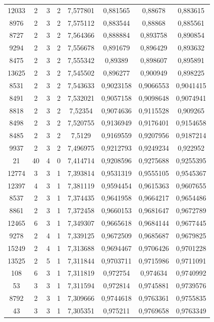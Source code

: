 \begin{longtable}{|c|c|c|c|c|c|c|c|}
12033 & 2 & 3 & 2 & 7,577801 & 0,881565 & 0,88678 & 0,883615 \\
8976 & 2 & 3 & 2 & 7,575112 & 0,883544 & 0,88868 & 0,885561 \\
8727 & 2 & 3 & 2 & 7,564366 & 0,888884 & 0,893758 & 0,890854 \\
9294 & 2 & 3 & 2 & 7,556678 & 0,891679 & 0,896429 & 0,893632 \\
8475 & 2 & 3 & 2 & 7,555342 & 0,89389 & 0,898607 & 0,895891 \\
13625 & 2 & 3 & 2 & 7,545502 & 0,896277 & 0,900949 & 0,898225 \\
8531 & 2 & 3 & 2 & 7,543633 & 0,9023158 & 0,9066553 & 0,9041415 \\
8491 & 2 & 3 & 2 & 7,532021 & 0,9057158 & 0,9098648 & 0,9074941 \\
8818 & 2 & 3 & 2 & 7,52354 & 0,9074636 & 0,9115528 & 0,909265 \\
8498 & 2 & 3 & 2 & 7,520755 & 0,9136949 & 0,9176401 & 0,9154658 \\
8485 & 2 & 3 & 2 & 7,5129 & 0,9169559 & 0,9207956 & 0,9187214 \\
9937 & 2 & 3 & 2 & 7,496975 & 0,9212793 & 0,9249234 & 0,922952 \\
21 & 40 & 4 & 0 & 7,414714 & 0,9208596 & 0,9275688 & 0,9255395 \\
12774 & 3 & 3 & 1 & 7,393814 & 0,9531319 & 0,9555105 & 0,9545367 \\
12397 & 4 & 3 & 1 & 7,381119 & 0,9594454 & 0,9615363 & 0,9607655 \\
8537 & 2 & 3 & 1 & 7,374435 & 0,9641958 & 0,9664217 & 0,9654486 \\
8861 & 2 & 3 & 1 & 7,372458 & 0,9660153 & 0,9681647 & 0,9672789 \\
12465 & 6 & 3 & 1 & 7,349307 & 0,9665618 & 0,9684144 & 0,9677445 \\
9278 & 2 & 4 & 1 & 7,339125 & 0,9672509 & 0,9685687 & 0,9679825 \\
15249 & 2 & 4 & 1 & 7,313688 & 0,9694467 & 0,9706426 & 0,9701228 \\
13525 & 2 & 5 & 1 & 7,311844 & 0,9703711 & 0,9715986 & 0,9711091 \\
108 & 6 & 3 & 1 & 7,311819 & 0,972754 & 0,974634 & 0,9740992 \\
53 & 3 & 3 & 1 & 7,311594 & 0,972814 & 0,9745881 & 0,9739576 \\
8792 & 2 & 3 & 1 & 7,309666 & 0,9744618 & 0,9763361 & 0,9755835 \\
43 & 3 & 3 & 1 & 7,305351 & 0,975211 & 0,9769658 & 0,9763349 \\

\end{longtable}
